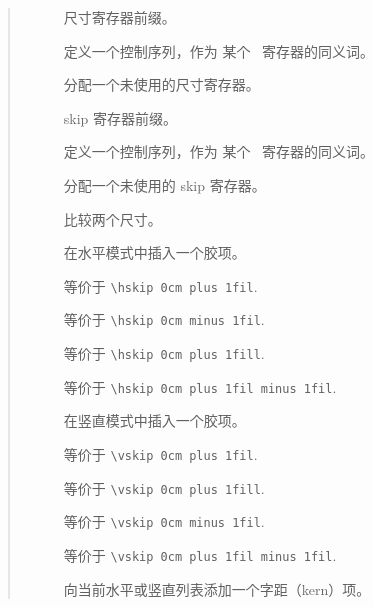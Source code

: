 \documentclass[a4paper]{rapport3}
\makeatletter
\newenvironment{disp}{\begin{quotation}}{\end{quotation}}
\newenvironment{inventory}{\begin{description}}{\end{description}}
\def\cstoidx#1\par{\index{#1@\cs{#1}}}
\def\csidx#1{\cstoidx #1\par\cs{#1}}
\makeatother
\begin{document}
\begin{disp}
\begin{inventory}
\item [] 
      尺寸寄存器前缀。

\item [] 
      定义一个控制序列，作为
      某个~ 寄存器的同义词。

\item [] 
      分配一个未使用的尺寸寄存器。 

\item [] 
      skip 寄存器前缀。

\item [] 
      定义一个控制序列，作为
      某个~ 寄存器的同义词。

\item []
      分配一个未使用的 skip 寄存器。

\item [] 
      比较两个尺寸。 

\item []  
      在水平模式中插入一个胶项。

\item [\csidx{hfil}] 
      等价于 
      \verb-\hskip 0cm plus 1fil-.

\item [\csidx{hfilneg}] 
      等价于 
      \verb-\hskip 0cm minus 1fil-.

\item [\csidx{hfill}] 
      等价于 
      \verb-\hskip 0cm plus 1fill-.

\item [\csidx{hss}] 
      等价于 
      \verb-\hskip 0cm plus 1fil minus 1fil-.

\item []  
      在竖直模式中插入一个胶项。

\item [\csidx{vfil}] 
      等价于 
      \verb-\vskip 0cm plus 1fil-.

\item [\csidx{vfill}] 
      等价于 
      \verb-\vskip 0cm plus 1fill-.

\item [\csidx{vfilneg}] 
      等价于 
      \verb-\vskip 0cm minus 1fil-.

\item [\csidx{vss}] 
      等价于 
      \verb-\vskip 0cm plus 1fil minus 1fil-.

\item []  
      向当前水平或竖直列表添加一个字距（kern）项。


\end{inventory}
\end{disp}
\end{document}
